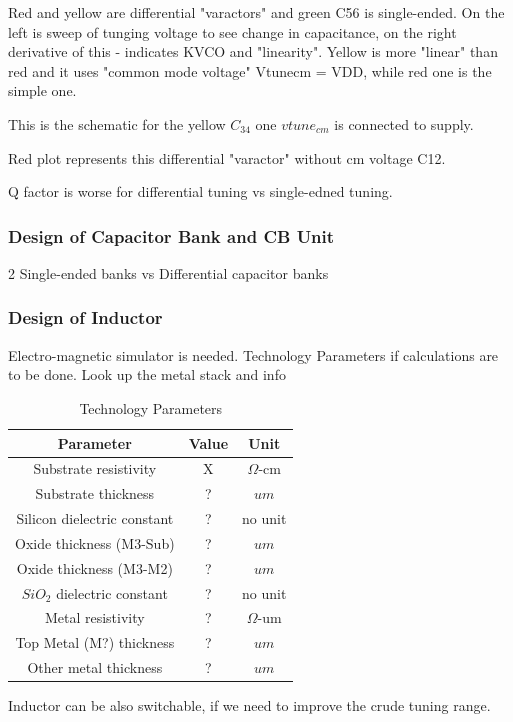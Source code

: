 Red and yellow are differential "varactors" and green C56 is single-ended. On the left is sweep of tunging voltage to see change in capacitance, on the right derivative of this - indicates KVCO and "linearity".
Yellow is more "linear" than red and  it uses "common mode voltage" Vtunecm = VDD, while red one is the simple one.

This is the schematic for the yellow $C_{34}$ one $vtune_{cm}$ is connected to supply.

Red plot represents this differential "varactor" without cm voltage C12.




	

Q factor is worse for differential tuning vs single-edned tuning.

\subsubsection{Design of Capacitor Bank and CB Unit} %

2 Single-ended banks vs Differential capacitor banks

\subsubsection{Design of Inductor}

Electro-magnetic simulator is needed. Technology Parameters if calculations are to be done. Look up the metal stack and info %

\begin{table}[ht]
	\centering
	\begin{tabular}{|c|c|c|}
		\hline
		Parameter & Value & Unit \\
		\hline
		\hline
		Substrate resistivity & X & $\Omega$-\unit{cm}\\
		\hline
		Substrate thickness & ? & $um$ \\
		\hline
		Silicon dielectric constant & ? & no unit \\
		\hline
		Oxide thickness (M3-Sub) & ? & $um$ \\
		\hline
		Oxide thickness (M3-M2) & ? & $um$ \\
		\hline
		$SiO_2$ dielectric constant & ? & no unit \\
		\hline
		Metal resistivity & ? & $\Omega$-\unit{um} \\
		\hline
		Top Metal (M?) thickness & ? & $um$ \\
		\hline
		Other metal thickness& ? & $um$ \\
		\hline
	\end{tabular}
	\label{tech-param}
	\caption{Technology Parameters} 

\end{table}

Inductor can be also switchable, if we need to improve the crude tuning range.

